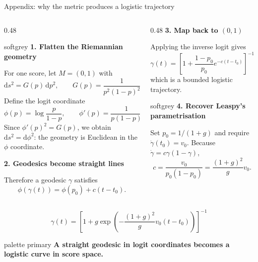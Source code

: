 \documentclass{beamer}
\newcommand{\takeaway}[1]{%
  \begin{beamercolorbox}[rounded=true,sep=0.7ex,wd=\linewidth]{palette primary}
    \centering\bfseries #1
  \end{beamercolorbox}}
\newcommand{\softbox}[2]{%
  \begin{beamercolorbox}[rounded=true,sep=0.8ex,wd=\linewidth]{#1}#2\end{beamercolorbox}}
\begin{document}
\begin{frame}{Appendix: why the metric produces a logistic trajectory}
  \scriptsize
  \setlength{\abovedisplayskip}{0.35em}
  \setlength{\belowdisplayskip}{0.35em}
  \begin{columns}[T,onlytextwidth]
    \begin{column}{0.48\textwidth}
      \softbox{softgrey}{
        \textbf{1. Flatten the Riemannian geometry}\par
        For one score, let $M=(0,1)$ with
        \[
          \mathrm ds^2=G(p)\,\mathrm dp^2,
          \qquad G(p)=\frac{1}{p^2(1-p)^2}.
        \]
        Define the logit coordinate
        \[
          \phi(p)=\log\!\frac{p}{1-p},
          \qquad \phi'(p)=\frac{1}{p(1-p)}.
        \]
        Since $\phi'(p)^2=G(p)$, we obtain
        $\mathrm ds^2=\mathrm d\phi^2$: the geometry is Euclidean
        in the $\phi$ coordinate.
      }

      \vspace{0.55em}
      \textbf{2. Geodesics become straight lines}\par
      Therefore a geodesic $\gamma$ satisfies
      \[
        \phi(\gamma(t))=\phi(p_0)+c(t-t_0).
      \]
    \end{column}

    \begin{column}{0.48\textwidth}
      \textbf{3. Map back to $(0,1)$}\par
      Applying the inverse logit gives
      \[
        \gamma(t)=
        \left[1+\frac{1-p_0}{p_0}
        e^{-c(t-t_0)}\right]^{-1},
      \]
      which is a bounded logistic trajectory.

      \vspace{0.55em}
      \softbox{softgrey}{
        \textbf{4. Recover Leaspy's parametrisation}\par
        Set $p_0=1/(1+g)$ and require
        $\dot\gamma(t_0)=v_0$. Because
        $\dot\gamma=c\gamma(1-\gamma)$,
        \[
          c=\frac{v_0}{p_0(1-p_0)}
           =\frac{(1+g)^2}{g}v_0.
        \]
      }
    \end{column}
  \end{columns}

  \vspace{0.35em}
  \[
    \boxed{\gamma(t)=\left[1+g\exp\!\left(
      -\frac{(1+g)^2}{g}v_0(t-t_0)\right)\right]^{-1}}
  \]
  \vspace{-0.2em}
  \takeaway{A straight geodesic in logit coordinates becomes a logistic curve in score space.}
\end{frame}
\end{document}
